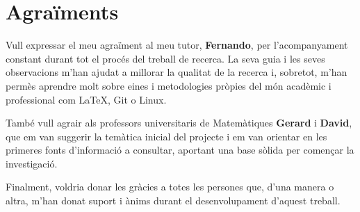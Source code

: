 \chapter*{Agraïments}
Vull expressar el meu agraïment al meu tutor, \textbf{Fernando}, per l’acompanyament constant
durant tot el procés del treball de recerca. La seva guia i les seves observacions m’han ajudat
a millorar la qualitat de la recerca i, sobretot, m’han permès aprendre molt sobre eines i
metodologies pròpies del món acadèmic i professional com LaTeX, Git o Linux.

També vull agrair als professors universitaris de Matemàtiques \textbf{Gerard} i \textbf{David},
que em van suggerir la temàtica inicial del projecte i em van orientar en les primeres fonts
d’informació a consultar, aportant una base sòlida per començar la investigació.

Finalment, voldria donar les gràcies a totes les persones que, d’una manera o altra, m’han donat
suport i ànims durant el desenvolupament d’aquest treball.
